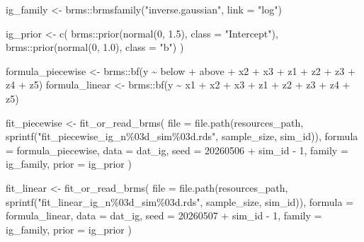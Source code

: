 \documentclass[
  english,
  letterpaper,
  DIV=11,
  numbers=noendperiod]{scrartcl}
\newenvironment{Shaded}{\begin{snugshade}}{\end{snugshade}}
\newcommand{\AttributeTok}[1]{\textcolor[rgb]{0.40,0.45,0.13}{#1}}
\newcommand{\DecValTok}[1]{\textcolor[rgb]{0.68,0.00,0.00}{#1}}
\newcommand{\FloatTok}[1]{\textcolor[rgb]{0.68,0.00,0.00}{#1}}
\newcommand{\FunctionTok}[1]{\textcolor[rgb]{0.28,0.35,0.67}{#1}}
\newcommand{\NormalTok}[1]{\textcolor[rgb]{0.00,0.23,0.31}{#1}}
\newcommand{\OtherTok}[1]{\textcolor[rgb]{0.00,0.23,0.31}{#1}}
\newcommand{\SpecialCharTok}[1]{\textcolor[rgb]{0.37,0.37,0.37}{#1}}
\newcommand{\StringTok}[1]{\textcolor[rgb]{0.13,0.47,0.30}{#1}}
\begin{document}
\begin{Shaded}
\begin{Highlighting}[]
\NormalTok{ig\_family }\OtherTok{\textless{}{-}}\NormalTok{ brms}\SpecialCharTok{::}\FunctionTok{brmsfamily}\NormalTok{(}\StringTok{"inverse.gaussian"}\NormalTok{, }\AttributeTok{link =} \StringTok{"log"}\NormalTok{)}

\NormalTok{ig\_prior }\OtherTok{\textless{}{-}} \FunctionTok{c}\NormalTok{(}
\NormalTok{  brms}\SpecialCharTok{::}\FunctionTok{prior}\NormalTok{(}\FunctionTok{normal}\NormalTok{(}\DecValTok{0}\NormalTok{, }\FloatTok{1.5}\NormalTok{), }\AttributeTok{class =} \StringTok{"Intercept"}\NormalTok{),}
\NormalTok{  brms}\SpecialCharTok{::}\FunctionTok{prior}\NormalTok{(}\FunctionTok{normal}\NormalTok{(}\DecValTok{0}\NormalTok{, }\FloatTok{1.0}\NormalTok{), }\AttributeTok{class =} \StringTok{"b"}\NormalTok{)}
\NormalTok{)}

\NormalTok{formula\_piecewise }\OtherTok{\textless{}{-}}\NormalTok{ brms}\SpecialCharTok{::}\FunctionTok{bf}\NormalTok{(y }\SpecialCharTok{\textasciitilde{}}\NormalTok{ below }\SpecialCharTok{+}\NormalTok{ above }\SpecialCharTok{+}\NormalTok{ x2 }\SpecialCharTok{+}\NormalTok{ x3 }\SpecialCharTok{+}\NormalTok{ z1 }\SpecialCharTok{+}\NormalTok{ z2 }\SpecialCharTok{+}\NormalTok{ z3 }\SpecialCharTok{+}\NormalTok{ z4 }\SpecialCharTok{+}\NormalTok{ z5)}
\NormalTok{formula\_linear    }\OtherTok{\textless{}{-}}\NormalTok{ brms}\SpecialCharTok{::}\FunctionTok{bf}\NormalTok{(y }\SpecialCharTok{\textasciitilde{}}\NormalTok{ x1 }\SpecialCharTok{+}\NormalTok{ x2 }\SpecialCharTok{+}\NormalTok{ x3 }\SpecialCharTok{+}\NormalTok{ z1 }\SpecialCharTok{+}\NormalTok{ z2 }\SpecialCharTok{+}\NormalTok{ z3 }\SpecialCharTok{+}\NormalTok{ z4 }\SpecialCharTok{+}\NormalTok{ z5)}

\NormalTok{fit\_piecewise }\OtherTok{\textless{}{-}} \FunctionTok{fit\_or\_read\_brms}\NormalTok{(}
  \AttributeTok{file =} \FunctionTok{file.path}\NormalTok{(resources\_path, }\FunctionTok{sprintf}\NormalTok{(}\StringTok{"fit\_piecewise\_ig\_n\%03d\_sim\%03d.rds"}\NormalTok{, sample\_size, sim\_id)),}
  \AttributeTok{formula =}\NormalTok{ formula\_piecewise,}
  \AttributeTok{data =}\NormalTok{ dat\_ig,}
  \AttributeTok{seed =} \DecValTok{20260506} \SpecialCharTok{+}\NormalTok{ sim\_id }\SpecialCharTok{{-}} \DecValTok{1}\NormalTok{,}
  \AttributeTok{family =}\NormalTok{ ig\_family,}
  \AttributeTok{prior =}\NormalTok{ ig\_prior}
\NormalTok{)}

\NormalTok{fit\_linear }\OtherTok{\textless{}{-}} \FunctionTok{fit\_or\_read\_brms}\NormalTok{(}
  \AttributeTok{file =} \FunctionTok{file.path}\NormalTok{(resources\_path, }\FunctionTok{sprintf}\NormalTok{(}\StringTok{"fit\_linear\_ig\_n\%03d\_sim\%03d.rds"}\NormalTok{, sample\_size, sim\_id)),}
  \AttributeTok{formula =}\NormalTok{ formula\_linear,}
  \AttributeTok{data =}\NormalTok{ dat\_ig,}
  \AttributeTok{seed =} \DecValTok{20260507} \SpecialCharTok{+}\NormalTok{ sim\_id }\SpecialCharTok{{-}} \DecValTok{1}\NormalTok{,}
  \AttributeTok{family =}\NormalTok{ ig\_family,}
  \AttributeTok{prior =}\NormalTok{ ig\_prior}
\NormalTok{)}
\end{Highlighting}
\end{Shaded}
\end{document}
